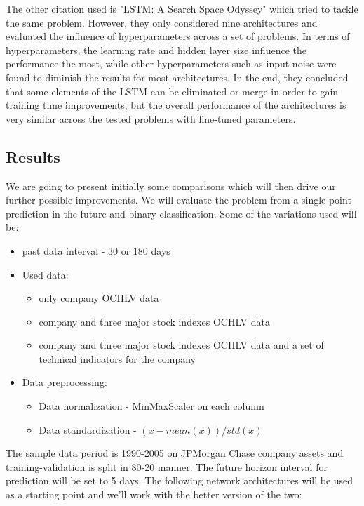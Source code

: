 The other citation used is "LSTM: A Search Space Odyssey" \cite{greff2016lstm} which tried to tackle the same problem. However, they only considered nine architectures and evaluated the influence of hyperparameters across a set of problems. In terms of hyperparameters, the learning rate and hidden layer size influence the performance the most, while other hyperparameters such as input noise were found to diminish the results for most architectures. In the end, they concluded that some elements of the LSTM can be eliminated or merge in order to gain training time improvements, but the overall performance of the architectures is very similar across the tested problems with fine-tuned parameters.


\subsection{Results}

We are going to present initially some comparisons which will then drive our further possible improvements. We will evaluate the problem from a single point prediction in the future and binary classification. Some of the variations used will be:

\begin{itemize}
    \item past data interval - 30 or 180 days
    \item Used data:
        \begin{itemize}
            \item only company OCHLV data
            \item company and three major stock indexes OCHLV data
            \item company and three major stock indexes OCHLV data and a set of technical indicators for the company
        \end{itemize}
   \item Data preprocessing:
        \begin{itemize}
            \item Data normalization - MinMaxScaler on each column
            \item Data standardization - $(x - mean(x)) / std(x)$
        \end{itemize}
\end{itemize}

The sample data period is 1990-2005 on JPMorgan Chase company assets and training-validation is split in 80-20 manner. The future horizon interval for prediction will be set to 5 days. The following network architectures will be used as a starting point and we'll work with the better version of the two:

